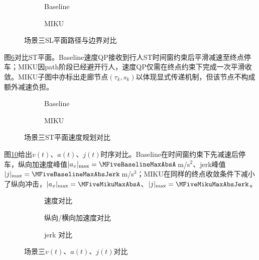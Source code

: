 \begin{figure}[H]
\centering
\begin{subfigure}[b]{\textwidth}
  \centering
  
  \caption{Baseline}
  \label{fig:exp_ch7_sl:a}
\end{subfigure}

\begin{subfigure}[b]{\textwidth}
  \centering
  
  \caption{MIKU}
  \label{fig:exp_ch7_sl:b}
\end{subfigure}
\caption{场景三SL平面路径与边界对比}
\label{fig:exp_ch7_sl}
\end{figure}

图\ref{fig:exp_ch7_st}对比ST平面。Baseline速度QP接收到行人ST时间窗约束后平滑减速至终点停车；MIKU因path阶段已经避开行人，速度QP仅需在终点约束下完成一次平滑收敛。MIKU子图中亦标出走廊节点$(\tau_k,s_k)$以体现显式传递机制，但该节点不构成额外减速负担。

\begin{figure}[H]
\centering
\begin{subfigure}[b]{0.48\textwidth}
  \centering
  
  \caption{Baseline}
  \label{fig:exp_ch7_st:a}
\end{subfigure}\hfill
\begin{subfigure}[b]{0.48\textwidth}
  \centering
  
  \caption{MIKU}
  \label{fig:exp_ch7_st:b}
\end{subfigure}
\caption{场景三ST平面速度规划对比}
\label{fig:exp_ch7_st}
\end{figure}

图\ref{fig:exp_ch7_va}给出$v(t)$、$a(t)$、$j(t)$时序对比。Baseline在时间窗约束下先减速后停车，纵向加速度峰值$|a_x|_{\max}=\MFiveBaselineMaxAbsA$\,m/s$^2$、jerk峰值$|j|_{\max}=\MFiveBaselineMaxAbsJerk$\,m/s$^3$；MIKU在同样的终点收敛条件下减小了纵向冲击，$|a_x|_{\max}=\MFiveMikuMaxAbsA$、$|j|_{\max}=\MFiveMikuMaxAbsJerk$。

\begin{figure}[H]
\centering
\begin{subfigure}[b]{\textwidth}
  \centering
  
  \caption{速度对比}
  \label{fig:exp_ch7_va:a}
\end{subfigure}

\begin{subfigure}[b]{\textwidth}
  \centering
  
  \caption{纵向/横向加速度对比}
  \label{fig:exp_ch7_va:b}
\end{subfigure}

\begin{subfigure}[b]{\textwidth}
  \centering
  
  \caption{jerk 对比}
  \label{fig:exp_ch7_va:c}
\end{subfigure}
\caption{场景三$v(t)$、$a(t)$、$j(t)$对比}
\label{fig:exp_ch7_va}
\end{figure}

